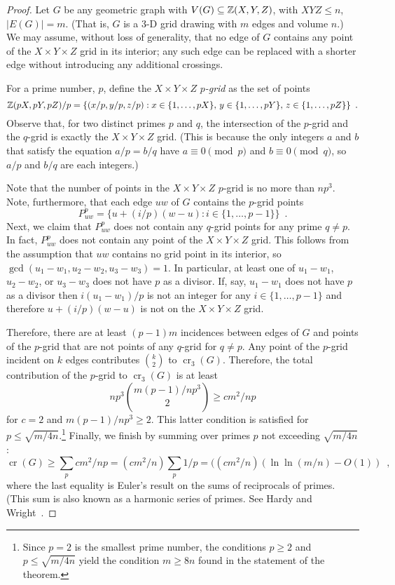 \documentclass{patmorin}
\DeclareMathOperator{\crs}{cr}
\begin{document}
\begin{proof}
  Let $G$ be any geometric graph with $V(G)\subseteq\mathbb{Z}(X,Y,Z)$, with
  $XYZ\le n$, $|E(G)|=m$. (That is, $G$ is a 3-D grid drawing with $m$
  edges and volume $n$.)  We may assume, without loss of generality,
  that no edge of $G$ contains any point of the $X\times Y\times Z$
  grid in its interior; any such edge can be replaced with a shorter
  edge without introducing any additional crossings.

  For a prime number, $p$, define the $X\times Y\times Z$ \emph{$p$-grid}
  as the set of points
  \[
    \mathbb{Z}(pX,pY,pZ)/p = \{(x/p,y/p,z/p): x\in\{1,\ldots,pX\},\,
    y\in\{1,\ldots,pY\},\, z\in\{1,\ldots,pZ\}\} \enspace .
  \]
  Observe that, for two distinct primes $p$ and $q$, the intersection
  of the $p$-grid and the $q$-grid is exactly the $X\times Y\times Z$
  grid. (This is because the only integers $a$ and $b$ that satisfy the
  equation $a/p = b/q$ have $a\equiv 0 \pmod{p}$ and $b\equiv 0\pmod q$,
  so $a/p$ and $b/q$ are each integers.)

  Note that the number of points in the $X\times Y\times Z$ $p$-grid is
  no more than $np^3$.  Note, furthermore, that each edge $uw$ of $G$
  contains the $p$-grid points
  \[
      P_{uw}^p = \{ u+(i/p)(w-u) : i\in\{1,\ldots,p-1\} \} \enspace .
  \]
  Next, we claim that $P_{uw}^p$ does not contain any $q$-grid points for
  any prime $q\neq p$.  In fact, $P_{uw}^p$ does not contain any point
  of the $X\times Y\times Z$ grid.  This follows from the assumption that
  $uw$ contains no grid point in its interior, so $\gcd(u_1-w_1, u_2-w_2,
  u_3-w_3)=1$.  In particular, at least one of $u_1-w_1$, $u_2-w_2$,
  or $u_3-w_3$ does not have $p$ as a divisor.  If, say, $u_1-w_1$ does
  not have $p$ as a divisor then $i(u_1-w_1)/p$ is not an integer for
  any $i\in\{1,\ldots,p-1\}$ and therefore $u+(i/p)(w-u)$ is not on the
  $X\times Y\times Z$ grid.
  
  Therefore, there are at least $(p-1)m$ incidences between edges of $G$
  and points of the $p$-grid that are not points of any $q$-grid for
  $q\neq p$.  Any point of the $p$-grid incident on $k$ edges contributes
  $\binom{k}{2}$ to $\crs_3(G)$.  Therefore, the total contribution of
  the $p$-grid to $\crs_3(G)$ is at least
  \[
      np^3\binom{m(p-1)/np^3}{2} \ge cm^2/np
  \]
  for $c=2$ and $m(p-1)/np^3 \ge 2$.  This latter condition is satisfied
  for $p \le \sqrt{m/4n}$.\footnote{Since $p=2$ is the smallest prime
  number, the conditions $p\ge 2$ and $p\le\sqrt{m/4n}$ yield the
  condition $m\ge 8n$ found in the statement of the theorem.} Finally,
  we finish by summing over primes $p$ not exceeding $\sqrt{m/4n}$:
  \[
     \crs(G) \ge \sum_{p} cm^2/np 
             = (cm^2/n) \sum_p 1/p 
             = ((cm^2/n)(\ln\ln(m/n)-O(1)) \enspace ,
  \]
  where the last equality is Euler's result on the sums of reciprocals
  of primes. (This sum is also known as a harmonic series of primes.
  See Hardy and Wright~\cite[Section~22.7]{hardy.wright:introduction}.
\end{proof}
\end{document}
